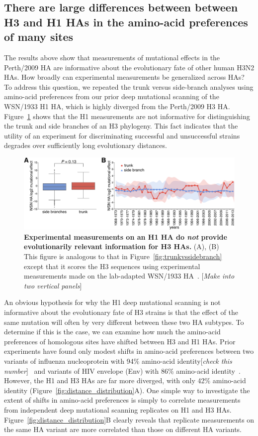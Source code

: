 \documentclass[9pt,twocolumn,twoside]{pnas-new}
\newcommand{\comment}[1]{{\color{red}[\textsl{#1}]}}
\begin{document}
\subsection*{There are large differences between between H3 and H1 HAs in the amino-acid preferences of many sites}
The results above show that measurements of mutational effects in the Perth/2009 HA are informative about the evolutionary fate of other human H3N2 HAs.
How broadly can experimental measurements be generalized across HAs?
To address this question, we repeated the trunk versus side-branch analyses using amino-acid preferences from our prior deep mutational scanning of the WSN/1933 H1 HA, which is highly diverged from the Perth/2009 H3 HA.
Figure~\ref{fig:WSN_trunkvssidebranch} shows that the H1 measurements are not informative for distinguishing the trunk and side branches of an H3 phylogeny.
This fact indicates that the utility of an experiment for discriminating successful and unsuccessful strains degrades over sufficiently long evolutionary distances. 

\begin{figure}
\centering
\includegraphics[width=\columnwidth]{figs/WSN_trunkvssidebranch/WSN_trunkvssidebranch.pdf}
\caption{\label{fig:WSN_trunkvssidebranch}
{\bf Experimental measurements on an H1 HA do \emph{not} provide evolutionarily relevant information for H3 HAs.}
(A), (B) This figure is analogous to that in Figure~\ref{fig:trunkvssidebranch} except that it scores the H3 sequences using experimental measurements made on the lab-adapted WSN/1933 HA~\cite{doud2016accurate}.
\comment{Make into two vertical panels}
}
\end{figure}

An obvious hypothesis for why the H1 deep mutational scanning is not informative about the evolutionary fate of H3 strains is that the effect of the same mutation will often by very different between these two HA subtypes.
To determine if this is the case, we can examine how much the amino-acid preferences of homologous sites have shifted between H3 and H1 HAs.
Prior experiments have found only modest shifts in amino-acid preferences between two variants of influenza nucleoprotein with 94\% amino-acid identity\comment{check this number}~\cite{doud2015site} and variants of HIV envelope (Env) with 86\% amino-acid identity~\cite{haddox2017mapping}.
However, the H1 and H3 HAs are far more diverged, with only 42\% amino-acid identity (Figure~\ref{fig:distance_distribution}A).
One simple way to investigate the extent of shifts in amino-acid preferences is simply to correlate measurements from independent deep mutational scanning replicates on H1 and H3 HAs.
Figure~\ref{fig:distance_distribution}B clearly reveals that replicate measurements on the same HA variant are more correlated than those on different HA variants.
\end{document}
